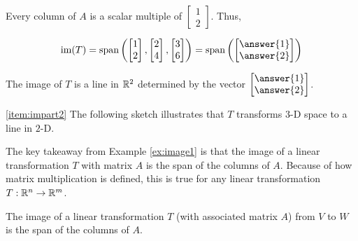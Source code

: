 \documentclass{ximera}
\begin{document}
\begin{example}
\begin{explanation}
Every column of $A$ is a scalar multiple of $\begin{bmatrix}1\\2\end{bmatrix}$.  Thus,
 
$$\mbox{im}(T)=\mbox{span}\left(\begin{bmatrix}1\\2\end{bmatrix}, \begin{bmatrix}2\\4\end{bmatrix}, \begin{bmatrix}3\\6\end{bmatrix}\right)=\mbox{span}\left(\begin{bmatrix}\answer{1}\\\answer{2}\end{bmatrix}\right)$$
 
The image of $T$ is a line in $\mathbb{R}^2$ determined by the vector $\begin{bmatrix}\answer{1}\\\answer{2}\end{bmatrix}$.
 
\ref{item:impart2} The following sketch illustrates that $T$ transforms $3$-D space to a line in $2$-D.
 
\begin{center}
\end{center}
\end{explanation}
\end{example}
 
 
The key takeaway from Example \ref{ex:image1} is that the image of a linear transformation $T$ with matrix $A$ is the span of the columns of $A$.  Because of how matrix multiplication is defined, this is true for any linear transformation $T:\mathbb{R}^n\rightarrow \mathbb{R}^m$.

\begin{theorem}
  The image of a linear transformation $T$ (with associated matrix $A$) from $V$ to $W$ is the span of the columns of $A$.
\end{theorem}
 
\end{document}
